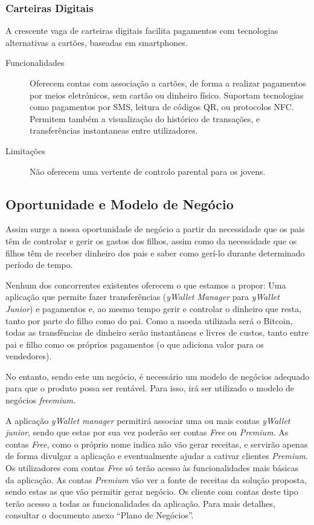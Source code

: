 \documentclass[12pt,a4paper]{article}
\begin{document}
    \subsubsection{Carteiras Digitais}  

      A crescente vaga de carteiras digitais facilita pagamentos com tecnologias alternativas a cartões, baseadas em smartphones.

      \begin{description}
        \item[Funcionalidades]Oferecem contas com associação a cartões, de forma a realizar pagamentos por meios eletrónicos, sem cartão ou dinheiro físico. Suportam tecnologias como pagamentos por SMS, leitura de códigos QR, ou protocolos NFC. Permitem também a visualização do histórico de transações, e transferências instantaneas entre utilizadores.
        \item[Limitações]Não oferecem uma vertente de controlo parental para os jovens.
      \end{description}

  \subsection{Oportunidade e Modelo de Negócio}

    Assim surge a nossa oportunidade de negócio a partir da necessidade que os pais têm de controlar e gerir os gastos dos filhos, assim como da necessidade que os filhos têm de receber dinheiro dos pais e saber como gerí-lo durante determinado período de tempo.

    Nenhum dos concorrentes existentes oferecem o que estamos a propor: Uma aplicação que permite fazer transferências (\emph{yWallet Manager }para \emph{yWallet Junior}) e pagamentos e, ao mesmo tempo gerir e controlar o dinheiro que resta, tanto por parte do filho como do pai. Como a moeda utilizada será o Bitcoin, todas as transfências de dinheiro serão instantâneas e livres de custos, tanto entre pai e filho como os próprios pagamentos (o que adiciona valor para os vendedores).
  
    No entanto, sendo este um negócio, é necessário um modelo de negócios adequado para que o produto possa ser rentável. Para isso, irá ser utilizado o modelo de negócios \emph{freemium}.
  
    A aplicação \emph{yWallet manager} permitirá associar uma ou mais contas \emph{yWallet junior}, sendo que estas por sua vez poderão ser contas \emph{Free} ou \emph{Premium}. As contas \emph{Free}, como o próprio nome indica não vão gerar receitas, e servirão apenas de forma divulgar a aplicação e eventualmente ajudar a cativar clientes \emph{Premium}. Os utilizadores com contas \emph{Free} só terão acesso às funcionalidades mais básicas da aplicação. As contas \emph{Premium} vão ver a fonte de receitas da solução proposta, sendo estas as que vão permitir gerar negócio. Os cliente com contas deste tipo terão acesso a todas as funcionalidades da aplicação. Para mais detalhes, consultar o documento anexo ``Plano de Negócios''.
\end{document}
